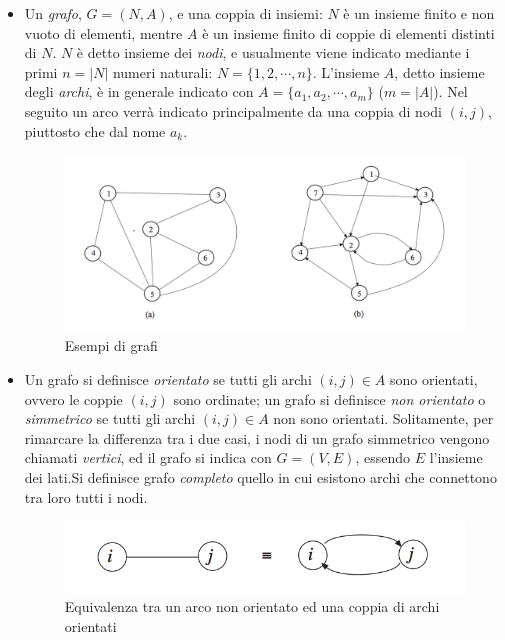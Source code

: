 	\begin{itemize}
		\item Un \emph{grafo}, $G = (N, A)$, e una coppia di insiemi: $N$ è un insieme finito e non vuoto di elementi, mentre $A$ è un insieme finito di coppie di elementi distinti di $N$.
		$N$ è detto insieme dei \emph{nodi}, e usualmente viene indicato mediante i primi $n = |N|$ numeri naturali: $N = \{1 , 2 , \cdots , n \}$. L’insieme $A$, detto insieme degli \emph{archi}, è in generale indicato con $A = \{ a_1 , a_2 , \cdots , a_m \}$ ($m = |A|$). 
		Nel seguito un arco verrà indicato principalmente da una coppia di nodi $(i,j)$, piuttosto che dal nome $a_k$.
		\begin{figure}[H]
			\centering
			\includegraphics[keepaspectratio=true,scale=0.3]{img/esempio_grafi.png}
			\caption{Esempi di grafi}
			\label{fig:graph_example}
		\end{figure}

		\item Un grafo si definisce \emph{orientato} se tutti gli archi $(i,j) \in A$ sono orientati, ovvero le coppie $(i,j)$ sono ordinate; un grafo si definisce \emph{non orientato} o \emph{simmetrico} se tutti gli archi $(i,j) \in A$ non sono orientati. 
		Solitamente, per rimarcare la differenza tra i due casi, i nodi di un grafo simmetrico vengono chiamati \emph{vertici}, ed il grafo si indica con $G = (V,E)$, essendo $E$ l’insieme dei lati.Si definisce grafo \emph{completo} quello in cui esistono archi che connettono tra loro tutti i nodi.
		\begin{figure}[H]
			\centering
			\includegraphics[keepaspectratio=true,scale=0.6]{img/equivalenza_archi.png}
			\caption{Equivalenza tra un arco non orientato ed una coppia di archi orientati}
			\label{fig:arc_equivalence}
		\end{figure}		


\end{itemize}
